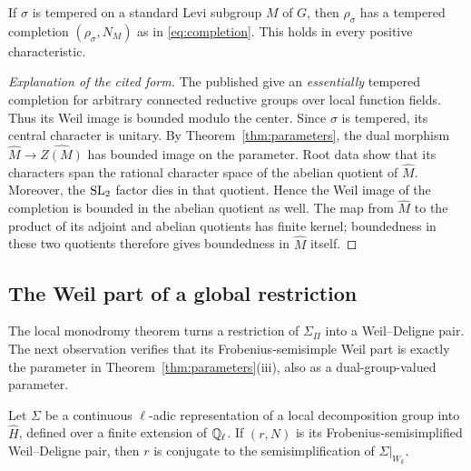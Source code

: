 \begin{theorem}
\label{thm:tempered-completion}
If $\sigma$ is tempered on a standard Levi subgroup $M$ of $G$, then
$\rho_\sigma$ has a tempered completion $(\rho_\sigma,N_M)$ as in
\eqref{eq:completion}. This holds in every positive characteristic.
\end{theorem}

\begin{proof}[Explanation of the cited form]
The published \cite[Theorem~1.2 and Corollary~1.3]{GHS} give an
\emph{essentially} tempered completion for arbitrary connected reductive
groups over local function fields. Thus its Weil image is bounded modulo
the center. Since $\sigma$ is tempered, its central character is unitary.
By Theorem~\ref{thm:parameters}, the dual morphism
$\widehat M\to\widehat{Z(M)}$ has bounded image on the parameter.
Root data show that its characters span the rational character space
of the abelian quotient of $\widehat M$. Moreover, the $\mathrm{SL}_2$ factor
dies in that quotient. Hence the Weil image of the completion is
bounded in the abelian quotient as well. The map from $\widehat M$ to
the product of its adjoint and abelian quotients has finite kernel;
boundedness in these two quotients therefore gives boundedness in
$\widehat M$ itself.
\end{proof}

\subsection{The Weil part of a global restriction}

The local monodromy theorem turns a restriction of $\Sigma_\Pi$ into a
Weil--Deligne pair. The next observation verifies that its
Frobenius-semisimple Weil part is exactly the parameter in
Theorem~\ref{thm:parameters}(iii), also as a dual-group-valued parameter.

\begin{lemma}\label{lem:wd-semisimplification}
Let $\Sigma$ be a continuous $\ell$-adic representation of a local
decomposition group into $\widehat H$, defined over a finite extension
of $\mathbb Q_\ell$. If $(r,N)$ is its Frobenius-semisimplified Weil--Deligne
pair, then $r$ is conjugate to the semisimplification of $\Sigma|_{W_k}$.
\end{lemma}

